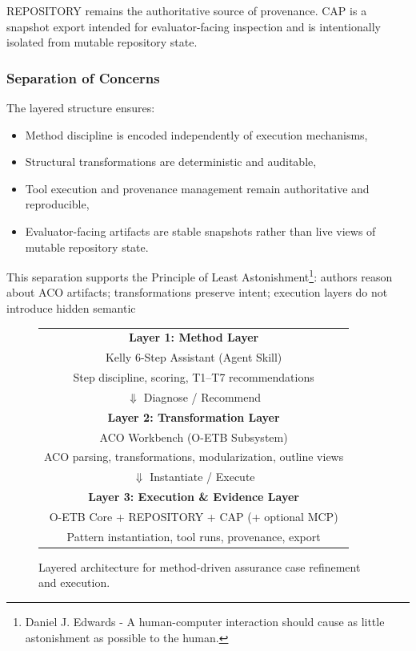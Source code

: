 \documentclass[12pt,twoside,a4paper]{article}
\begin{document}
REPOSITORY remains the authoritative source of provenance. CAP is a snapshot export intended for evaluator-facing inspection and is intentionally isolated from mutable repository state.

\subsubsection{Separation of Concerns}

The layered structure ensures:

\begin{itemize}
  \item Method discipline is encoded independently of execution mechanisms,
  \item Structural transformations are deterministic and auditable,
  \item Tool execution and provenance management remain authoritative and reproducible,
  \item Evaluator-facing artifacts are stable snapshots rather than live views of mutable repository state.
\end{itemize}

This separation supports the Principle of Least Astonishment\footnote{Daniel J. Edwards - A human-computer interaction should cause as little astonishment as possible to the human.}: authors reason about ACO artifacts; transformations preserve intent; execution layers do not introduce hidden semantic

\begin{figure}[ht]
\centering
\begin{tabular}{|c|}
\hline
\textbf{Layer 1: Method Layer} \\
Kelly 6-Step Assistant (Agent Skill) \\
\small{Step discipline, scoring, T1--T7 recommendations} \\
\hline
$\Downarrow$ Diagnose / Recommend \\
\hline
\textbf{Layer 2: Transformation Layer} \\
ACO Workbench (O-ETB Subsystem) \\
\small{ACO parsing, transformations, modularization, outline views} \\
\hline
$\Downarrow$ Instantiate / Execute \\
\hline
\textbf{Layer 3: Execution \& Evidence Layer} \\
O-ETB Core + REPOSITORY + CAP (+ optional MCP) \\
\small{Pattern instantiation, tool runs, provenance, export} \\
\hline
\end{tabular}
\caption{Layered architecture for method-driven assurance case refinement and execution.}
\label{fig:Conceptual architecture}
\end{figure}
\end{document}
